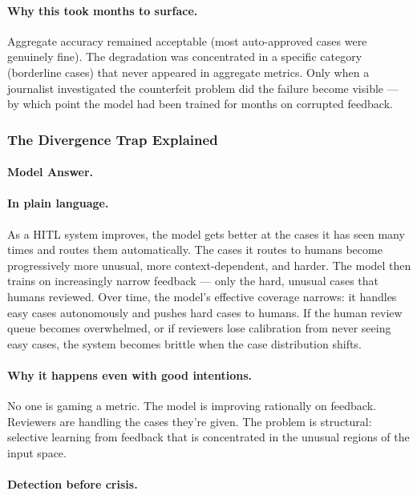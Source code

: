 \paragraph{Why this took months to surface.}

Aggregate accuracy remained acceptable (most auto-approved cases were genuinely fine). The degradation was concentrated in a specific category (borderline cases) that never appeared in aggregate metrics. Only when a journalist investigated the counterfeit problem did the failure become visible --- by which point the model had been trained for months on corrupted feedback.

\subsubsection{The Divergence Trap Explained}

\paragraph{Model Answer.}

\paragraph{In plain language.}

As a HITL system improves, the model gets better at the cases it has seen many times and routes them automatically. The cases it routes to humans become progressively more unusual, more context-dependent, and harder. The model then trains on increasingly narrow feedback --- only the hard, unusual cases that humans reviewed. Over time, the model's effective coverage narrows: it handles easy cases autonomously and pushes hard cases to humans. If the human review queue becomes overwhelmed, or if reviewers lose calibration from never seeing easy cases, the system becomes brittle when the case distribution shifts.

\paragraph{Why it happens even with good intentions.}

No one is gaming a metric. The model is improving rationally on feedback. Reviewers are handling the cases they're given. The problem is structural: selective learning from feedback that is concentrated in the unusual regions of the input space.

\paragraph{Detection before crisis.}

